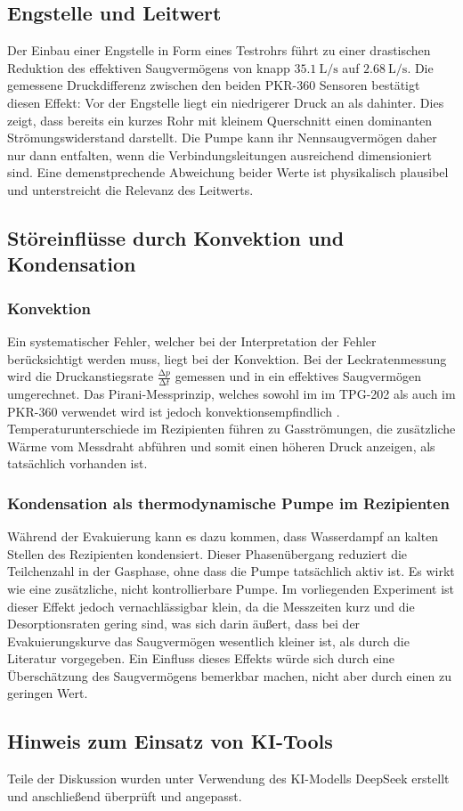 \subsection{Engstelle und Leitwert}
Der Einbau einer Engstelle in Form eines Testrohrs führt zu einer drastischen 
Reduktion des effektiven Saugvermögens von knapp $\qty{35.1}{\liter\per\second}$
auf $\qty{2,68}{\liter\per\second}$. Die gemessene Druckdifferenz zwischen den
beiden PKR-360 Sensoren bestätigt diesen Effekt: Vor der Engstelle liegt ein
niedrigerer Druck an als dahinter. Dies zeigt, dass bereits ein kurzes Rohr mit
kleinem Querschnitt einen dominanten Strömungswiderstand darstellt. Die Pumpe
kann ihr Nennsaugvermögen daher nur dann entfalten, wenn die Verbindungsleitungen
ausreichend dimensioniert sind. Eine demenstprechende Abweichung beider Werte
ist physikalisch plausibel und unterstreicht die Relevanz des Leitwerts.

\subsection{Störeinflüsse durch Konvektion und Kondensation}
\subsubsection{Konvektion}
Ein systematischer Fehler, welcher bei der Interpretation der Fehler berücksichtigt 
werden muss, liegt bei der Konvektion. Bei der Leckratenmessung wird die
Druckanstiegsrate $\frac{\increment p}{\increment t}$ gemessen und in ein 
effektives Saugvermögen umgerechnet. Das Pirani-Messprinzip, welches sowohl im 
im TPG-202 als auch im PKR-360 verwendet wird ist jedoch konvektionsempfindlich
\cite{glossar}. Temperaturunterschiede im Rezipienten führen zu Gasströmungen,
die zusätzliche Wärme vom Messdraht abführen und somit einen höheren Druck
anzeigen, als tatsächlich vorhanden ist.

\subsubsection{Kondensation als thermodynamische Pumpe im Rezipienten}
Während der Evakuierung kann es dazu kommen, dass Wasserdampf an kalten Stellen
des Rezipienten kondensiert. Dieser Phasenübergang reduziert die Teilchenzahl 
in der Gasphase, ohne dass die Pumpe tatsächlich aktiv ist. Es wirkt wie eine
zusätzliche, nicht kontrollierbare Pumpe. Im vorliegenden Experiment ist dieser 
Effekt jedoch vernachlässigbar klein, da die Messzeiten kurz und die 
Desorptionsraten gering sind, was sich darin äußert, dass bei der Evakuierungskurve 
das Saugvermögen wesentlich kleiner ist, als durch die Literatur vorgegeben. Ein 
Einfluss dieses Effekts würde sich durch eine Überschätzung des Saugvermögens 
bemerkbar machen, nicht aber durch einen zu geringen Wert.

\subsection*{Hinweis zum Einsatz von KI-Tools}
Teile der Diskussion wurden unter Verwendung des KI-Modells DeepSeek
erstellt und anschließend überprüft und angepasst.